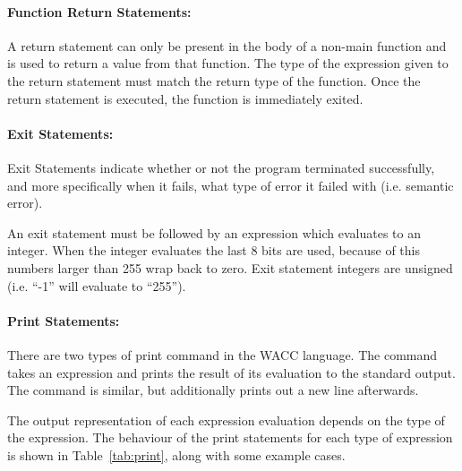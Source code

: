 \documentclass[a4paper]{article}
\theoremstyle{definition}
\begin{document}
\paragraph{Function Return Statements:}
A return statement can only be present in the body of a non-main function and is used to return a value from that function.
The type of the expression given to the return statement must match the return type of the function.
Once the return statement is executed, the function is immediately exited.

\paragraph{Exit Statements:}
Exit Statements indicate whether or not the program terminated successfully, and more specifically when it fails, what type of error it failed with (i.e. semantic error).

An exit statement must be followed by an expression  which evaluates to an integer. When the integer evaluates the last 8 bits are used, because of this numbers larger than 255 wrap back to zero. Exit statement integers are unsigned (i.e. ``-1'' will evaluate to ``255'').

\paragraph{Print Statements:}
There are two types of print command in the WACC language.
The  command takes an expression and prints the result of its evaluation to the standard output.
The  command is similar, but additionally prints out a new line afterwards.

The output representation of each expression evaluation depends on the type of the expression.
The behaviour of the print statements for each type of expression is shown in Table~\ref{tab:print}, along with some example cases.
\end{document}
